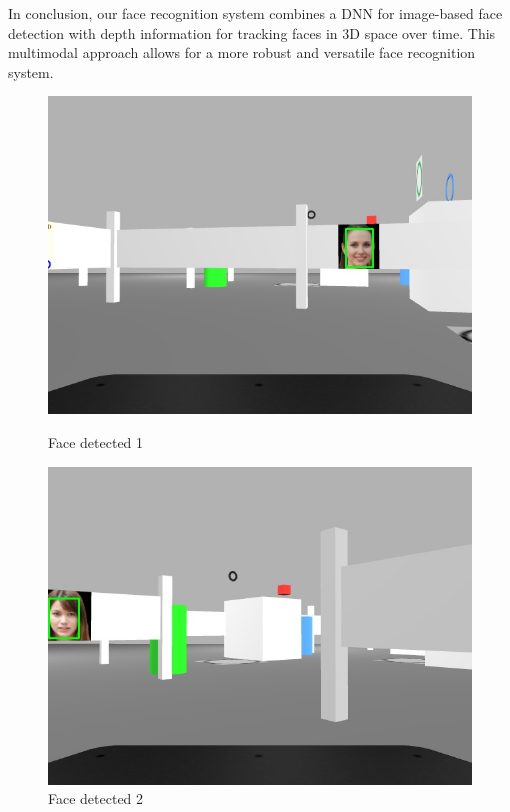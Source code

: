 \documentclass{article}
\begin{document}
In conclusion, our face recognition system combines a DNN for image-based face detection with depth information for tracking faces in 3D space over time. This multimodal approach allows for a more robust and versatile face recognition system.

\begin{figure}
  \centering
  \begin{minipage}[t]{0.45\textwidth}
    \centering
    \includegraphics[width=\textwidth]{images/face1.jpg}
    \caption{Face detected 1}
    \label{fig:face1}
  \end{minipage}
  \hfill
  \begin{minipage}[t]{0.45\textwidth}
    \centering
    \includegraphics[width=\textwidth]{images/face2.jpg}
    \caption{Face detected 2}
    \label{fig:face2}
  \end{minipage}
\end{figure}
\end{document}
